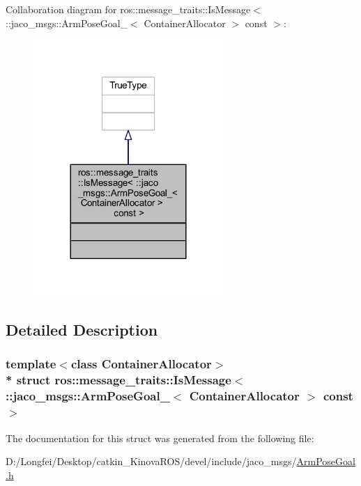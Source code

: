 Collaboration diagram for ros\+:\+:message\+\_\+traits\+:\+:Is\+Message$<$ \+:\+:jaco\+\_\+msgs\+:\+:Arm\+Pose\+Goal\+\_\+$<$ Container\+Allocator $>$ const $>$\+:
\nopagebreak
\begin{figure}[H]
\begin{center}
\leavevmode
\includegraphics[width=204pt]{de/d23/structros_1_1message__traits_1_1IsMessage_3_01_1_1jaco__msgs_1_1ArmPoseGoal___3_01ContainerAlloc4f3da586438c9519de124f48d7306a4c}
\end{center}
\end{figure}


\subsection{Detailed Description}
\subsubsection*{template$<$class Container\+Allocator$>$\\*
struct ros\+::message\+\_\+traits\+::\+Is\+Message$<$ \+::jaco\+\_\+msgs\+::\+Arm\+Pose\+Goal\+\_\+$<$ Container\+Allocator $>$ const  $>$}



The documentation for this struct was generated from the following file\+:\begin{DoxyCompactItemize}
\item 
D\+:/\+Longfei/\+Desktop/catkin\+\_\+\+Kinova\+R\+O\+S/devel/include/jaco\+\_\+msgs/\hyperlink{ArmPoseGoal_8h}{Arm\+Pose\+Goal.\+h}\end{DoxyCompactItemize}
